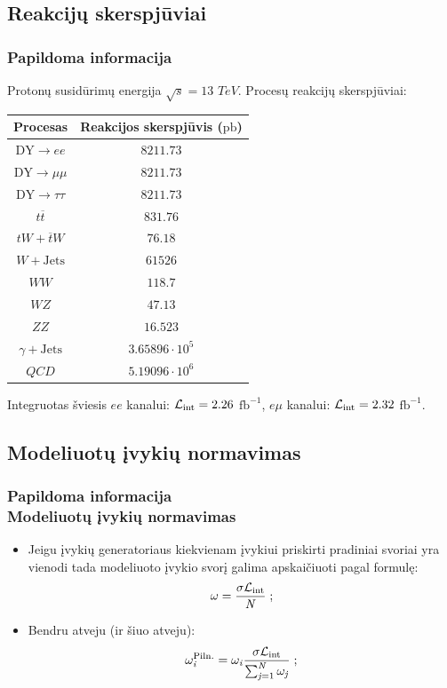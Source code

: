 \documentclass[xcolor=dvipsnames]{beamer}
\newcommand{\Lumi}{{\cal L}_\mathrm{int}}
\newcommand{\pb}{$\mathrm{pb}$}
\newcommand{\invfb}{$\mathrm{fb}^{-1}$}
\newcommand{\WJets}{\mathit{W}+\mathrm{Jets}}
\newcommand{\WW}{\mathit{WW}}
\newcommand{\ZZ}{\mathit{ZZ}}
\newcommand{\WZ}{\mathit{WZ}}
\newcommand{\gJets}{\gamma\! +\!\mathrm{Jets}}
\newcommand{\DYee}{\mathrm{DY} \! \rightarrow \! \mathit{ee}}
\newcommand{\DYtau}{\mathrm{DY} \! \rightarrow \! \tau\tau}
\newcommand{\dtW}{\mathit{tW}\! + \! \overline{\mathit{t}}\mathit{W}}
\newcommand{\QCD}{\mathit{QCD}}
\newcommand{\ttbar}{\mathit{t}\overline{\mathit{t}}}
\begin{document}
\begin{frame}
\subsection{Reakcijų skerspjūviai}
\frametitle{Papildoma informacija}
Protonų susidūrimų energija $\sqrt{\mathit{s}}=13$ $TeV$. Procesų reakcijų skerspjūviai:
\begin{table}[H]
\begin{tabular}{|c|c|}
\hline
Procesas & Reakcijos skerspjūvis (\pb) \\
\hline\hline
$\DYee$ & $8211.73$ \\
\hline
$\mathrm{DY}\!\rightarrow\! \mu\mu$ & $8211.73$ \\
\hline
$\DYtau$ & $8211.73$ \\
\hline
$\ttbar$ & $831.76$ \\
\hline
$\dtW$ & $76.18$ \\
\hline
$\WJets$ & $61526$ \\
\hline
$\WW$ & $118.7$ \\
\hline
$\WZ$ & $47.13$ \\
\hline
$\ZZ$ & $16.523$ \\
\hline
$\gJets$ & $3.65896\cdot10^{5}$ \\
\hline
$\QCD$ & $5.19096\cdot10^{6}$ \\
\hline
\end{tabular}
\end{table}
Integruotas šviesis $\mathit{ee}$ kanalui: $\Lumi=2.26$ \invfb, $\mathit{e\mu}$ kanalui: $\Lumi=2.32$ \invfb.\\
\end{frame}

\begin{frame}
\subsection{Modeliuotų įvykių normavimas}
\frametitle{Papildoma informacija\\ \small Modeliuotų įvykių normavimas}
\begin{itemize}
\item Jeigu įvykių generatoriaus kiekvienam įvykiui priskirti pradiniai svoriai yra vienodi tada modeliuoto įvykio svorį galima apskaičiuoti pagal formulę:
\begin{equation*}
\omega=\frac{\sigma \Lumi}{\mathit{N}} \; ;
\end{equation*}
\item Bendru atveju (ir šiuo atveju):
\begin{equation*}
\omega_{\mathit{i}}^{\mathrm{Piln.}}=\omega_{\mathit{i}}\frac{\sigma \Lumi}{\sum_{\mathit{j}=1}^{\mathit{N}}\omega_{\mathit{j}}} \; ;
\end{equation*}
\end{itemize}
\end{frame}
\end{document}
